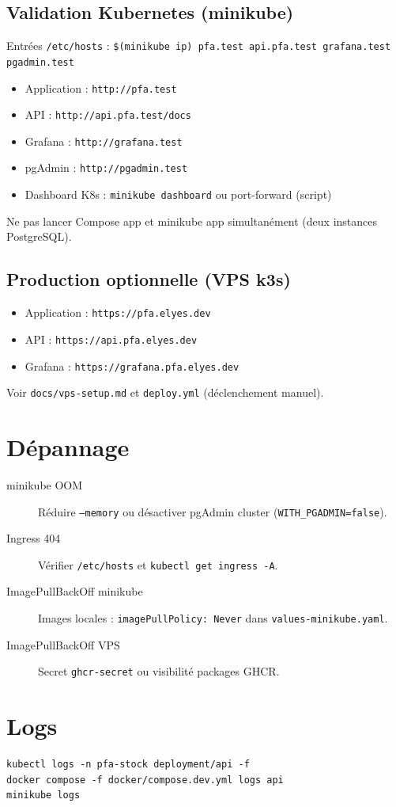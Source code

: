 \subsection{Validation Kubernetes (minikube)}

Entrées \texttt{/etc/hosts} : \verb|$(minikube ip) pfa.test api.pfa.test grafana.test pgadmin.test|

\begin{itemize}
  \item Application : \texttt{http://pfa.test}
  \item API : \texttt{http://api.pfa.test/docs}
  \item Grafana : \texttt{http://grafana.test}
  \item pgAdmin : \texttt{http://pgadmin.test}
  \item Dashboard K8s : \texttt{minikube dashboard} ou port-forward (script)
\end{itemize}

Ne pas lancer Compose app et minikube app simultanément (deux instances PostgreSQL).

\subsection{Production optionnelle (VPS k3s)}

\begin{itemize}
  \item Application : \texttt{https://pfa.elyes.dev}
  \item API : \texttt{https://api.pfa.elyes.dev}
  \item Grafana : \texttt{https://grafana.pfa.elyes.dev}
\end{itemize}

Voir \texttt{docs/vps-setup.md} et \texttt{deploy.yml} (déclenchement manuel).

\section{Dépannage}

\begin{description}
  \item[minikube OOM] Réduire \texttt{--memory} ou désactiver pgAdmin cluster (\texttt{WITH\_PGADMIN=false}).
  \item[Ingress 404] Vérifier \texttt{/etc/hosts} et \texttt{kubectl get ingress -A}.
  \item[ImagePullBackOff minikube] Images locales : \texttt{imagePullPolicy: Never} dans \texttt{values-minikube.yaml}.
  \item[ImagePullBackOff VPS] Secret \texttt{ghcr-secret} ou visibilité packages GHCR.
\end{description}

\section{Logs}

\begin{lstlisting}[style=bash]
kubectl logs -n pfa-stock deployment/api -f
docker compose -f docker/compose.dev.yml logs api
minikube logs
\end{lstlisting}
